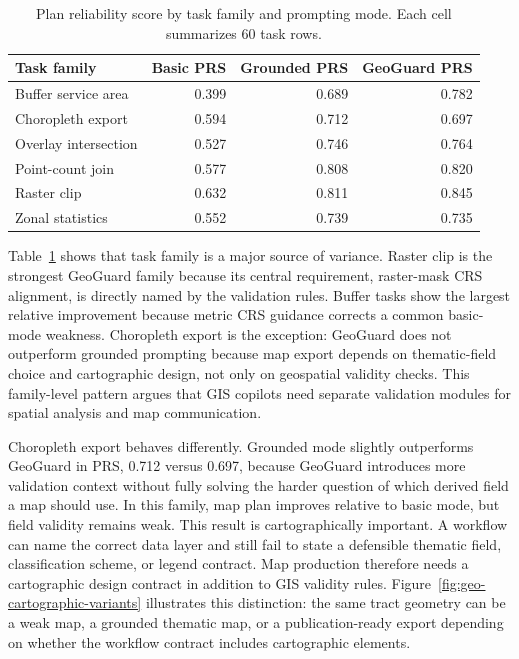 \documentclass[]{interact}
\begin{document}
\begin{table}[htbp]
\centering
\caption{Plan reliability score by task family and prompting mode. Each cell summarizes 60 task rows.}
\label{tab:category-summary}
\small
\setlength{\tabcolsep}{4pt}
\begin{tabular}{lrrr}
\toprule
Task family & Basic PRS & Grounded PRS & GeoGuard PRS \\
\midrule
Buffer service area & 0.399 & 0.689 & 0.782 \\
Choropleth export & 0.594 & 0.712 & 0.697 \\
Overlay intersection & 0.527 & 0.746 & 0.764 \\
Point-count join & 0.577 & 0.808 & 0.820 \\
Raster clip & 0.632 & 0.811 & 0.845 \\
Zonal statistics & 0.552 & 0.739 & 0.735 \\
\bottomrule
\end{tabular}
\end{table}

Table~\ref{tab:category-summary} shows that task family is a major source of variance. Raster clip is the strongest GeoGuard family because its central requirement, raster-mask CRS alignment, is directly named by the validation rules. Buffer tasks show the largest relative improvement because metric CRS guidance corrects a common basic-mode weakness. Choropleth export is the exception: GeoGuard does not outperform grounded prompting because map export depends on thematic-field choice and cartographic design, not only on geospatial validity checks. This family-level pattern argues that GIS copilots need separate validation modules for spatial analysis and map communication.

Choropleth export behaves differently. Grounded mode slightly outperforms GeoGuard in PRS, 0.712 versus 0.697, because GeoGuard introduces more validation context without fully solving the harder question of which derived field a map should use. In this family, map plan improves relative to basic mode, but field validity remains weak. This result is cartographically important. A workflow can name the correct data layer and still fail to state a defensible thematic field, classification scheme, or legend contract. Map production therefore needs a cartographic design contract in addition to GIS validity rules. Figure~\ref{fig:geo-cartographic-variants} illustrates this distinction: the same tract geometry can be a weak map, a grounded thematic map, or a publication-ready export depending on whether the workflow contract includes cartographic elements.
\end{document}
